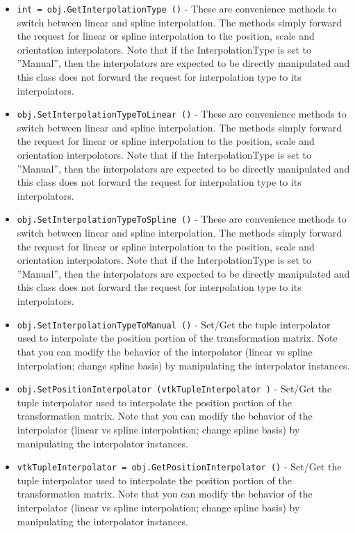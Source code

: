 \begin{itemize}
\item  \verb|int = obj.GetInterpolationType ()| -  These are convenience methods to switch between linear and spline
 interpolation. The methods simply forward the request for linear or
 spline interpolation to the position, scale and orientation
 interpolators. Note that if the InterpolationType is set to ''Manual'',
 then the interpolators are expected to be directly manipulated and
 this class does not forward the request for interpolation type to its
 interpolators.

\item  \verb|obj.SetInterpolationTypeToLinear ()| -  These are convenience methods to switch between linear and spline
 interpolation. The methods simply forward the request for linear or
 spline interpolation to the position, scale and orientation
 interpolators. Note that if the InterpolationType is set to ''Manual'',
 then the interpolators are expected to be directly manipulated and
 this class does not forward the request for interpolation type to its
 interpolators.

\item  \verb|obj.SetInterpolationTypeToSpline ()| -  These are convenience methods to switch between linear and spline
 interpolation. The methods simply forward the request for linear or
 spline interpolation to the position, scale and orientation
 interpolators. Note that if the InterpolationType is set to ''Manual'',
 then the interpolators are expected to be directly manipulated and
 this class does not forward the request for interpolation type to its
 interpolators.

\item  \verb|obj.SetInterpolationTypeToManual ()| -  Set/Get the tuple interpolator used to interpolate the position portion
 of the transformation matrix. Note that you can modify the behavior of
 the interpolator (linear vs spline interpolation; change spline basis)
 by manipulating the interpolator instances.

\item  \verb|obj.SetPositionInterpolator (vtkTupleInterpolator )| -  Set/Get the tuple interpolator used to interpolate the position portion
 of the transformation matrix. Note that you can modify the behavior of
 the interpolator (linear vs spline interpolation; change spline basis)
 by manipulating the interpolator instances.

\item  \verb|vtkTupleInterpolator = obj.GetPositionInterpolator ()| -  Set/Get the tuple interpolator used to interpolate the position portion
 of the transformation matrix. Note that you can modify the behavior of
 the interpolator (linear vs spline interpolation; change spline basis)
 by manipulating the interpolator instances.


\end{itemize}
